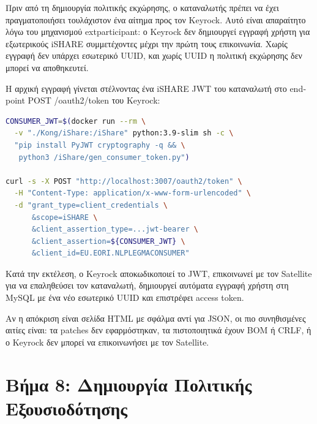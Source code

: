 Πριν από τη δημιουργία πολιτικής εκχώρησης, ο καταναλωτής πρέπει
να έχει πραγματοποιήσει τουλάχιστον ένα αίτημα προς τον
\textlatin{Keyrock}. Αυτό είναι απαραίτητο λόγω του μηχανισμού
\textlatin{extparticipant}: ο \textlatin{Keyrock} δεν δημιουργεί
εγγραφή χρήστη για εξωτερικούς \textlatin{iSHARE} συμμετέχοντες
μέχρι την πρώτη τους επικοινωνία. Χωρίς εγγραφή δεν υπάρχει
εσωτερικό \textlatin{UUID}, και χωρίς \textlatin{UUID} η πολιτική
εκχώρησης δεν μπορεί να αποθηκευτεί.

Η αρχική εγγραφή γίνεται στέλνοντας ένα \textlatin{iSHARE JWT} του
καταναλωτή στο \textlatin{endpoint} \textlatin{POST /oauth2/token}
του \textlatin{Keyrock}:

\begin{lstlisting}[language=bash, caption={Initial consumer registration in Keyrock.}, stringstyle=\color{black}, keywordstyle=\color{black}]
CONSUMER_JWT=$(docker run --rm \
  -v "./Kong/iShare:/iShare" python:3.9-slim sh -c \
  "pip install PyJWT cryptography -q && \
   python3 /iShare/gen_consumer_token.py")

curl -s -X POST "http://localhost:3007/oauth2/token" \
  -H "Content-Type: application/x-www-form-urlencoded" \
  -d "grant_type=client_credentials \
      &scope=iSHARE \
      &client_assertion_type=...jwt-bearer \
      &client_assertion=${CONSUMER_JWT} \
      &client_id=EU.EORI.NLPLEGMACONSUMER"
\end{lstlisting}

Κατά την εκτέλεση, ο \textlatin{Keyrock} αποκωδικοποιεί το
\textlatin{JWT}, επικοινωνεί με τον \textlatin{Satellite} για να
επαληθεύσει τον καταναλωτή, δημιουργεί αυτόματα εγγραφή χρήστη στη
\textlatin{MySQL} με ένα νέο εσωτερικό \textlatin{UUID} και
επιστρέφει \textlatin{access token}.

Αν η απόκριση είναι σελίδα \textlatin{HTML} με σφάλμα αντί για
\textlatin{JSON}, οι πιο συνηθισμένες αιτίες είναι: τα
\textlatin{patches} δεν εφαρμόστηκαν, τα πιστοποιητικά έχουν
\textlatin{BOM} ή \textlatin{CRLF}, ή ο \textlatin{Keyrock}
δεν μπορεί να επικοινωνήσει με τον \textlatin{Satellite}.

\section{Βήμα 8: Δημιουργία Πολιτικής Εξουσιοδότησης}
\label{sec:step8-policy}

